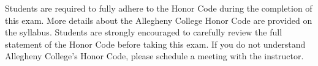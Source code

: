 \documentclass[11pt]{article}
\begin{document}

\vspace*{-.025in}

\noindent Students are required to fully adhere to the Honor Code during the
completion of this exam. More details about the Allegheny College Honor Code are
provided on the syllabus. Students are strongly encouraged to carefully review
the full statement of the Honor Code before taking this exam. If you do not
understand Allegheny College's Honor Code, please schedule a meeting with the
instructor.





\end{document}

